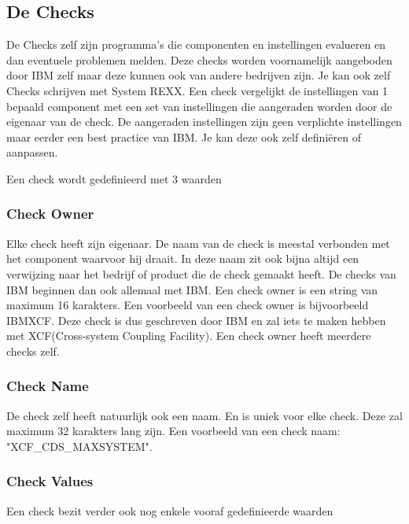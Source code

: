 \subsection{De Checks}
\label{sec:z/OS Health Checker Checks}

De Checks zelf zijn programma's die componenten en instellingen evalueren en dan eventuele problemen melden. Deze checks worden voornamelijk aangeboden door IBM zelf maar deze kunnen ook van andere bedrijven zijn. Je kan ook zelf Checks schrijven met System REXX. Een check vergelijkt de instellingen van 1 bepaald component met een set van instellingen die aangeraden worden door de eigenaar van de check. De aangeraden instellingen zijn geen verplichte instellingen maar eerder een best practice van IBM. Je kan deze ook zelf definiëren of aanpassen. \cite{Bezzi2010}

Een check wordt gedefinieerd met 3 waarden

\subsubsection{Check Owner}
\label{subsubsec:Check Owner}

Elke check heeft zijn eigenaar. De naam van de check is meestal verbonden met het component waarvoor hij draait. In deze naam zit ook bijna altijd een verwijzing naar het bedrijf of product die de check gemaakt heeft. De checks van IBM beginnen dan ook allemaal met IBM. Een check owner is een string van maximum 16 karakters. Een voorbeeld van een check owner is bijvoorbeeld IBMXCF. Deze check is dus geschreven door IBM en zal iets te maken hebben met XCF(Cross-system Coupling Facility). Een check owner heeft meerdere checks zelf. \cite{Bezzi2010}

\subsubsection{Check Name}
\label{subsubsec:Check Name}

De check zelf heeft natuurlijk ook een naam. En is uniek voor elke check. Deze zal maximum 32 karakters lang zijn. Een voorbeeld van een check naam: "XCF\_CDS\_MAXSYSTEM".

\subsubsection{Check Values}
\label{subsubsec:Check Values}

Een check bezit verder ook nog enkele vooraf gedefinieerde waarden


